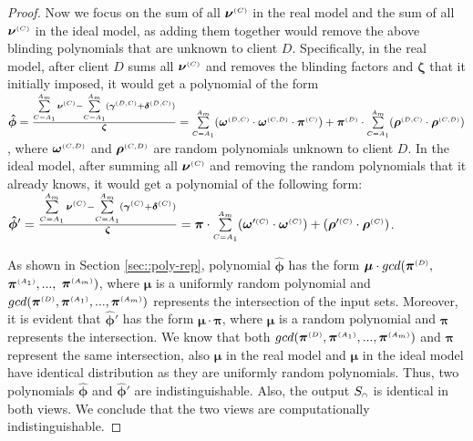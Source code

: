 \begin{proof}
 Now we focus on the sum of all ${\bm\nu}^{\scriptscriptstyle (C)}$ in the real model and the sum of all $ {\bm\nu}^{\scriptscriptstyle (C)}$ in the ideal model, as adding them together would remove the above blinding polynomials that are unknown to client $D$.  Specifically, in the real model, after client $D$ sums all  ${\bm\nu}^{\scriptscriptstyle (C)}$ and removes the blinding factors and $\bm\zeta$ that it initially imposed, it would get a polynomial of the  form $\bm{\hat\phi}= \frac{ \sum\limits^{ \scriptscriptstyle {   A}_{ \scriptscriptstyle {   m}}}_{  \scriptscriptstyle {  {C }= }  \scriptscriptstyle {   A}_{ \scriptscriptstyle {  1}}}\bm\nu^{ \scriptscriptstyle {  {(C)}} }-\sum\limits^{ \scriptscriptstyle {   A}_{ \scriptscriptstyle {   m}}}_{  \scriptscriptstyle {  {C }= }  \scriptscriptstyle {   A}_{ \scriptscriptstyle {  1}}}(\bm\gamma^{ \scriptscriptstyle {  {(D,C)}}} + \bm\delta^{ \scriptscriptstyle {  {(D,C)}}})}{\bm\zeta}= \sum\limits^{ \scriptscriptstyle {   A}_{ \scriptscriptstyle {   m}}}_{ \scriptscriptstyle {  {C }= }  \scriptscriptstyle {   A}_{ \scriptscriptstyle {  1}}}(\bm\omega^{ \scriptscriptstyle {  {(D,C)}}} \cdot \bm\omega^{ \scriptscriptstyle {  {(C,D)}}}\cdot \bm\pi^{ \scriptscriptstyle {  (C)}}) +\bm\pi^{ \scriptscriptstyle {  {(D)}}}\cdot\sum\limits^{ \scriptscriptstyle {   A}_{ \scriptscriptstyle {   m}}}_{ \scriptscriptstyle {  {C }= }  \scriptscriptstyle {   A}_{ \scriptscriptstyle {  1}}}(\bm\rho^{ \scriptscriptstyle {  {(D,C)}}} \cdot \bm\rho^{ \scriptscriptstyle {  {(C,D)}}}) $, where $\bm\omega^{ \scriptscriptstyle {  {(C,D)}}}$ and $\bm\rho^{ \scriptscriptstyle {  {(C,D)}}}$ are random polynomials unknown to client $D$. 
 In the ideal model, after summing all $ {\bm\nu}^{\scriptscriptstyle (C)}$ and removing the random polynomials that it already knows, it would get a polynomial of the following form: 
 $\bm{\hat\phi}'= \frac{\sum\limits^{ \scriptscriptstyle {   A}_{ \scriptscriptstyle {   m}}}_{  \scriptscriptstyle {  {C }= }  \scriptscriptstyle {   A}_{ \scriptscriptstyle {  1}}} {\bm\nu}^{\scriptscriptstyle(C)}-\sum\limits^{ \scriptscriptstyle {   A}_{ \scriptscriptstyle {   m}}}_{  \scriptscriptstyle {  {C }= }  \scriptscriptstyle {   A}_{ \scriptscriptstyle {  1}}}( {\bm\gamma}^{\scriptscriptstyle(C)} +  {\bm\delta}^{\scriptscriptstyle(C)})}{ {\bm\zeta}}=  {\bm\pi}\cdot\sum\limits^{ \scriptscriptstyle {   A}_{ \scriptscriptstyle {   m}}}_{ \scriptscriptstyle {  {C }= }  \scriptscriptstyle {   A}_{ \scriptscriptstyle {  1}}}( {\bm\omega}'^{\scriptscriptstyle(C)} \cdot  {\bm\omega}^{\scriptscriptstyle(C)})+( {\bm\rho}'^{\scriptscriptstyle(C)} \cdot  {\bm\rho}^{\scriptscriptstyle(C)})  $.  
 
 
 As shown in Section \ref{sec::poly-rep},  polynomial $\bm{\hat\phi}$ has the form $\bm\mu\cdot gcd( \bm\pi^{ \scriptscriptstyle {  {(D)}} },$ $\bm\pi^{\scriptscriptstyle (A_1)}, ..., $ $\bm\pi^{\scriptscriptstyle (A_m)})$, where $\bm\mu$ is a uniformly random polynomial and $gcd( \bm\pi^{ \scriptscriptstyle {  {(D)}} },\bm\pi^{\scriptscriptstyle (A_1)}, ..., \bm\pi^{\scriptscriptstyle (A_m)})$ represents the intersection of the input sets. Moreover, it is evident that $\bm{\hat\phi}'$ has the form $ {\bm\mu} \cdot  {\bm\pi}$, where $ {\bm\mu} $ is a random polynomial and $ {\bm\pi}$ represents the intersection. We know that both $gcd( \bm\pi^{ \scriptscriptstyle {  {(D)}} },\bm\pi^{\scriptscriptstyle (A_1)}, ..., \bm\pi^{\scriptscriptstyle (A_m)})$ and $ {\bm\pi}$  represent the same intersection, also  ${\bm\mu} $ in the real model and $ {\bm\mu} $ in the ideal model have identical distribution as they are uniformly random polynomials. Thus, two polynomials $\bm{\hat\phi}$ and $\bm{\hat\phi}'$ are indistinguishable. Also, the output $S_{\scriptscriptstyle \cap}$ is identical in both views. We conclude that the two views are computationally indistinguishable.
 

\end{proof}
